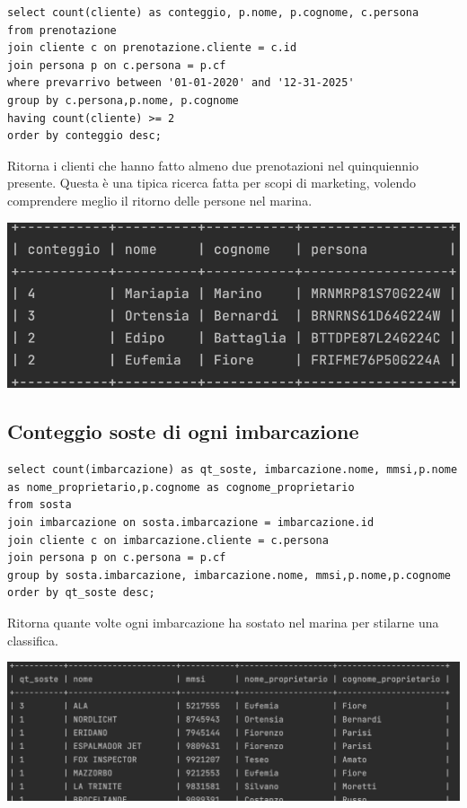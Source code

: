 \begin{lstlisting}
select count(cliente) as conteggio, p.nome, p.cognome, c.persona
from prenotazione
join cliente c on prenotazione.cliente = c.id
join persona p on c.persona = p.cf
where prevarrivo between '01-01-2020' and '12-31-2025'
group by c.persona,p.nome, p.cognome
having count(cliente) >= 2
order by conteggio desc;
\end{lstlisting}

Ritorna i clienti che hanno fatto almeno due prenotazioni nel quinquiennio presente.
Questa è una tipica ricerca fatta per scopi di marketing, volendo comprendere meglio il ritorno delle persone nel marina.

\begin{center}
    \includegraphics[width= 0.7\linewidth]{img/result_2prenotazioni.png}
\end{center}

\subsection{Conteggio soste di ogni imbarcazione}

\begin{lstlisting}
select count(imbarcazione) as qt_soste, imbarcazione.nome, mmsi,p.nome as nome_proprietario,p.cognome as cognome_proprietario
from sosta
join imbarcazione on sosta.imbarcazione = imbarcazione.id
join cliente c on imbarcazione.cliente = c.persona
join persona p on c.persona = p.cf
group by sosta.imbarcazione, imbarcazione.nome, mmsi,p.nome,p.cognome
order by qt_soste desc;
\end{lstlisting}

Ritorna quante volte ogni imbarcazione ha sostato nel marina per stilarne una classifica.

\begin{center}
    \includegraphics[width= 0.8\linewidth]{img/result_sosteimb.png}
\end{center}

